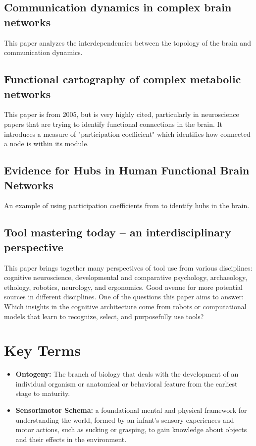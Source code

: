 \documentclass{article}
\begin{document}
\subsection{Communication dynamics in complex brain networks \cite{avena-koenigsberger_communication_2018}}

This paper analyzes the interdependencies between the topology of the brain and communication dynamics.

\subsection{Functional cartography of complex metabolic networks \cite{guimera_functional_2005}}

This paper is from 2005, but is very highly cited, particularly in neuroscience papers that are trying to identify functional connections in the brain. It introduces a measure of "participation coefficient" which identifies how connected a node is within its module.

\subsection{Evidence for Hubs in Human Functional Brain Networks \cite{power_evidence_2013}}

An example of using participation coefficients from \cite{guimera_functional_2005} to identify hubs in the brain.

\subsection{Tool mastering today – an interdisciplinary perspective \cite{schubotz_tool_2023}}
This paper brings together many perspectives of tool use from various disciplines: cognitive neuroscience, developmental and comparative psychology, archaeology, ethology, robotics, neurology, and ergonomics.
Good avenue for more potential sources in different disciplines.
One of the questions this paper aims to answer: Which insights in the cognitive architecture come from robots or computational models that learn to recognize, select, and purposefully use tools?

    
\section{Key Terms}
\begin{itemize}
    \item \textbf{Ontogeny: } The branch of biology that deals with the development of an individual organism or anatomical or behavioral feature from the earliest stage to maturity.
    \item \textbf{Sensorimotor Schema: } a foundational mental and physical framework for understanding the world, formed by an infant's sensory experiences and motor actions, such as sucking or grasping, to gain knowledge about objects and their effects in the environment.
\end{itemize}





\end{document}
